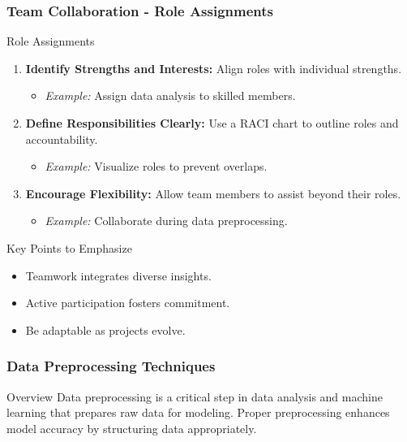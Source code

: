 \documentclass[aspectratio=169]{beamer}
\begin{document}
\begin{frame}[fragile]
    \frametitle{Team Collaboration - Role Assignments}
    \begin{block}{Role Assignments}
        \begin{enumerate}
            \item \textbf{Identify Strengths and Interests:} 
                Align roles with individual strengths.
                \begin{itemize}
                    \item \textit{Example:} Assign data analysis to skilled members.
                \end{itemize}

            \item \textbf{Define Responsibilities Clearly:} 
                Use a RACI chart to outline roles and accountability.
                \begin{itemize}
                    \item \textit{Example:} Visualize roles to prevent overlaps.
                \end{itemize}

            \item \textbf{Encourage Flexibility:} 
                Allow team members to assist beyond their roles.
                \begin{itemize}
                    \item \textit{Example:} Collaborate during data preprocessing.
                \end{itemize}
        \end{enumerate}
    \end{block}
    
    \begin{block}{Key Points to Emphasize}
        \begin{itemize}
            \item Teamwork integrates diverse insights.
            \item Active participation fosters commitment.
            \item Be adaptable as projects evolve.
        \end{itemize}
    \end{block}
\end{frame}

\begin{frame}[fragile]
    \frametitle{Data Preprocessing Techniques}
    \begin{block}{Overview}
        Data preprocessing is a critical step in data analysis and machine learning that prepares raw data for modeling. Proper preprocessing enhances model accuracy by structuring data appropriately.
    \end{block}
\end{frame}
\end{document}
